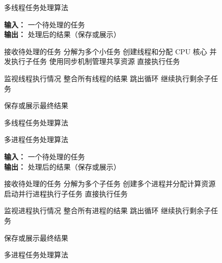 \begin{figure}[htbp]
    \begin{algorithm}[H]
        \caption{多线程任务处理算法}
        \label{fig:flowchart3_1}
        
        \textbf{输入：} 一个待处理的任务 \\
        \textbf{输出：} 处理后的结果（保存或展示）
        
        \begin{algorithmic}[1]
            \STATE 接收待处理的任务
                \STATE 分解为多个小任务
                \STATE 创建线程和分配 CPU 核心
                \STATE 并发执行子任务
                \STATE 使用同步机制管理共享资源
            \ELSE
                \STATE 直接执行任务
            \ENDIF
            
                \STATE 监视线程执行情况
                    \STATE 整合所有线程的结果
                    \STATE 跳出循环
                \ELSE
                    \STATE 继续执行剩余子任务
                \ENDIF
            \ENDWHILE
            
            \STATE 保存或展示最终结果
        \end{algorithmic}
    \end{algorithm}
    \caption{多线程任务处理算法}\label{fig:flowchart3_1}
\end{figure}
\begin{figure}[htbp]
    \begin{algorithm}[H]
        \caption{多进程任务处理算法}
        \label{fig:flowchart3_2}
        
        \textbf{输入：} 一个待处理的任务 \\
        \textbf{输出：} 处理后的结果（保存或展示）
        
        \begin{algorithmic}[1]
            \STATE 接收待处理的任务
                \STATE 分解为多个子任务
                \STATE 创建多个进程并分配计算资源
                \STATE 启动并行进程执行子任务
            \ELSE
                \STATE 直接执行任务
            \ENDIF
            
                \STATE 监视进程执行情况
                    \STATE 整合所有进程的结果
                    \STATE 跳出循环
                \ELSE
                    \STATE 继续执行剩余子任务
                \ENDIF
            \ENDWHILE
            
            \STATE 保存或展示最终结果
        \end{algorithmic}
    \end{algorithm}
    \caption{多进程任务处理算法}\label{fig:flowchart3_2}
\end{figure}
